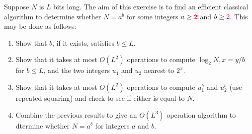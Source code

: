  Suppose $N$ is $L$ bits long.  The aim of this exercise is to find an efficient classical algorithm to determine whether $N=a^b$ for some integers $a \geq {\color{red}2}$ and $b \geq {\color{red}2}$.  This may be done as follows:
\begin{enumerate}[label=(\arabic*)]
\item Show that $b$, if it exists, satisfies $b\leq L$.
\item Show that it takes at most $O(L^2)$ operations to compute $\log_2 N, x=y/b$ for $b\leq L$, and the two integers $u_1$ and $u_2$ nearest to $2^x$.
\item Show that it takes at most $O(L^2)$ operations to compute $u_1^b$ and $u_2^b$ (use repeated squaring) and check to see if either is equal to $N$.
\item Combine the previous results to give an $O(L^3)$ operation algorithm to dtermine whether $N=a^b$ for integers $a$ and $b$.
\end{enumerate}
\Soln
